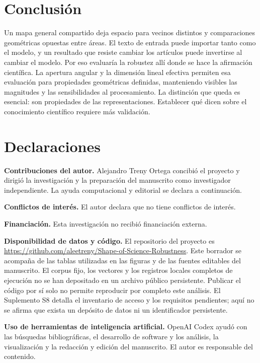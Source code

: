 \documentclass[12pt]{article}
\begin{document}
\section{Conclusión}
Un mapa general compartido deja espacio para vecinos distintos y comparaciones geométricas opuestas entre áreas. El texto de entrada puede importar tanto como el modelo, y un resultado que resiste cambiar los artículos puede invertirse al cambiar el modelo. Por eso evaluaría la robustez allí donde se hace la afirmación científica. La apertura angular y la dimensión lineal efectiva permiten esa evaluación para propiedades geométricas definidas, manteniendo visibles las magnitudes y las sensibilidades al procesamiento. La distinción que queda es esencial: son propiedades de las representaciones. Establecer qué dicen sobre el conocimiento científico requiere más validación.

\section*{Declaraciones}
\textbf{Contribuciones del autor.}
Alejandro Treny Ortega concibió el proyecto y dirigió la investigación y la preparación del manuscrito como investigador independiente. La ayuda computacional y editorial se declara a continuación.
\par\medskip
\textbf{Conflictos de interés.}
El autor declara que no tiene conflictos de interés.
\par\medskip
\textbf{Financiación.}
Esta investigación no recibió financiación externa.
\par\medskip
\textbf{Disponibilidad de datos y código.}
El repositorio del proyecto es \url{https://github.com/aleetreny/Shape-of-Science-Robustness}. Este borrador se acompaña de las tablas utilizadas en las figuras y de las fuentes editables del manuscrito. El corpus fijo, los vectores y los registros locales completos de ejecución no se han depositado en un archivo público persistente. Publicar el código por sí solo no permite reproducir por completo este análisis. El Suplemento S8 detalla el inventario de acceso y los requisitos pendientes; aquí no se afirma que exista un depósito de datos ni un identificador persistente.
\par\medskip
\textbf{Uso de herramientas de inteligencia artificial.}
OpenAI Codex ayudó con las búsquedas bibliográficas, el desarrollo de software y los análisis, la visualización y la redacción y edición del manuscrito. El autor es responsable del contenido.



\end{document}
